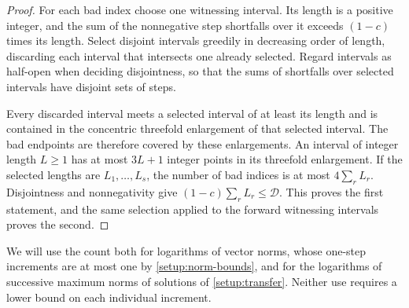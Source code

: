 \begin{proof}
For each bad index choose one witnessing interval. Its length is a
positive integer, and the sum of the nonnegative step shortfalls over
it exceeds $(1-c)$ times its length. Select disjoint intervals greedily
in decreasing order of length, discarding each interval that intersects
one already selected. Regard intervals as half-open when deciding
disjointness, so that the sums of shortfalls over selected intervals
have disjoint sets of steps.

Every discarded interval meets a selected interval of at least its
length and is contained in the concentric threefold enlargement of that
selected interval. The bad endpoints are therefore covered by these
enlargements. An interval of integer length $L\ge1$ has at most $3L+1$
integer points in its threefold enlargement. If the selected lengths
are $L_1,\ldots,L_s$, the number of bad indices is at most
$4\sum_r L_r$. Disjointness and nonnegativity give
$(1-c)\sum_rL_r\le\mathcal D$. This proves the first statement, and
the same selection applied to the forward witnessing intervals proves
the second.
\end{proof}

We will use the count both for logarithms of vector norms, whose
one-step increments are at most one by \cref{setup:norm-bounds}, and
for the logarithms of successive maximum norms of solutions of
\cref{setup:transfer}. Neither use requires a lower bound on each
individual increment.
